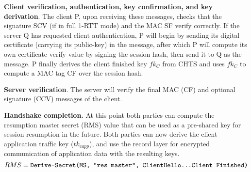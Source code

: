   \textbf{Client verification, authentication, key confirmation, and key derivation}. The client P,
  upon receiving these messages, checks that the signature SCV (if in full 1-RTT mode) and the  MAC SF verify correctly. If the server Q has requested client authentication, P will begin by sending its digital certificate (carrying its public-key) in the  message, after which P will compute its own certificate verify value  by signing the session hash, then send it to Q as the  message. P finally derives the client finished key $fk_C$ from CHTS and uses $fk_C$ to compute a MAC tag CF over the session hash.

  \textbf{Server verification}. The server will verify the final MAC (CF) and optional signature (CCV) messages of the client.

  \textbf{Handshake completion.} At this point both parties can compute the resumption master secret (RMS) value that can be used as a pre-shared key for session resumption in the future. Both parties can now derive the client application traffic key ($tk_{capp}$), and use the record layer for encrypted communication of application data with the resulting keys.
  \begin{equation}
    RMS = \texttt{Derive-Secret(MS, "res master", ClientHello...Client Finished)}
  \end{equation}





